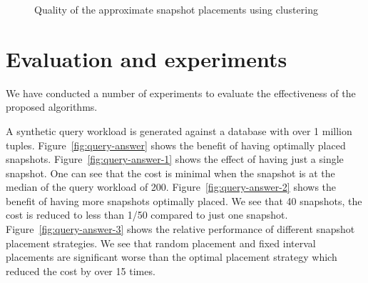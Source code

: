 \begin{figure}[t]
\centering
{}
\hfill
{}
    \caption{Quality of the approximate snapshot placements using clustering}
    \label{fig:place}
\end{figure}

\section{Evaluation and experiments}

We have conducted a number of experiments to evaluate the effectiveness of the
proposed algorithms.

A synthetic query workload is generated against a database with over 1
million tuples.  Figure~\ref{fig:query-answer} shows the benefit of having
optimally placed snapshots.  Figure~\ref{fig:query-answer-1} shows the effect of
having just a single snapshot.  One can see that the cost is minimal when the
snapshot is at the median of the query workload of 200.
Figure~\ref{fig:query-answer-2} shows the benefit of having more snapshots
optimally placed.  We see that 40 snapshots, the cost is reduced to less than
1/50 compared to just one snapshot.  Figure~\ref{fig:query-answer-3} shows the
relative performance of different snapshot placement strategies.  We see that
random placement and fixed interval placements are significant worse than the
optimal placement strategy which reduced the cost by over 15 times.

